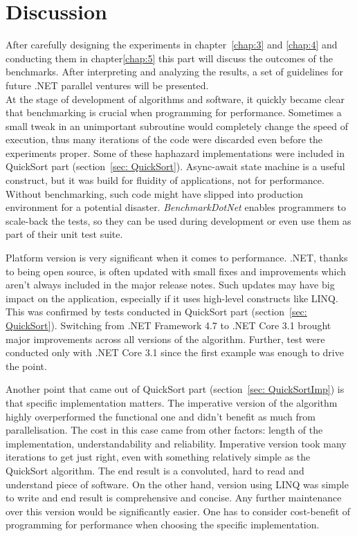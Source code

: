\chapter{Discussion}
After carefully designing the experiments in chapter~\ref{chap:3} and \ref{chap:4} and conducting them in chapter\ref{chap:5} this part will discuss the outcomes of the benchmarks. 
After interpreting and analyzing the results, a set of guidelines for future .NET parallel ventures will be presented. \\
 
At the stage of development of algorithms and software, it quickly became clear that benchmarking is crucial when programming for performance. 
Sometimes a small tweak in an unimportant subroutine would completely change the speed of execution, thus many iterations of the code were discarded even before the experiments proper. 
Some of these haphazard implementations were included in QuickSort part (section~\ref{sec: QuickSort}). Async-await state machine is a useful construct, but it was build for fluidity of applications, not for performance. Without benchmarking, such code might have slipped into production environment for a potential disaster. \emph{BenchmarkDotNet} enables programmers
to scale-back the tests, so they can be used during development or even use them as part of their unit test suite.

Platform version is very significant when it comes to performance. .NET, thanks to being open source, is often updated with small fixes and improvements which aren't always included in the major release notes. Such updates may have big impact on the application, especially if it uses high-level constructs like LINQ. This was confirmed by tests conducted in QuickSort part (section~\ref{sec: QuickSort}). Switching from .NET Framework 4.7 to .NET Core 3.1 brought major improvements across all versions of the algorithm. Further, test were conducted only with .NET Core 3.1 since the first example was enough to drive the point.

Another point that came out of QuickSort part (section~\ref{sec: QuickSortImp}) is that specific implementation matters. The imperative version of the algorithm highly overperformed the functional one and didn't benefit as much from parallelisation. The cost in this case came from other factors: length of the implementation, understandability and reliability. Imperative version took many iterations to get just right, even with something relatively simple as the QuickSort algorithm. The end result is a convoluted, hard to read and understand piece of software. On the other hand, version using LINQ was simple to write and end result is comprehensive and concise. Any further maintenance over this version would be significantly easier. One has to consider cost-benefit of programming for performance when choosing the specific implementation. 


